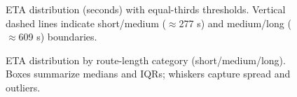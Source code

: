 \begin{figure}[t]
    \centering
    \caption{ETA distribution (seconds) with equal-thirds thresholds. Vertical dashed lines indicate short/medium ($\approx$277 s) and medium/long ($\approx$609 s) boundaries.}
    \label{fig:eta-dist}
\end{figure}

\begin{figure}[t]
    \centering
    \caption{ETA distribution by route-length category (short/medium/long). Boxes summarize medians and IQRs; whiskers capture spread and outliers.}
    \label{fig:eta-box}
\end{figure}

